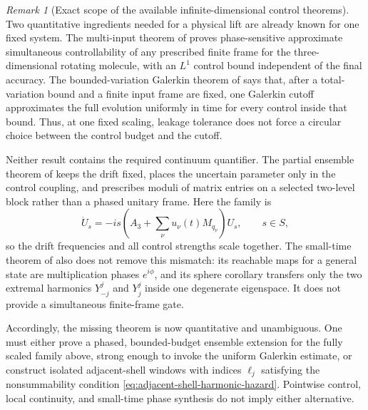 \documentclass[11pt]{article}
\theoremstyle{remark}
\newtheorem{remark}[theorem]{Remark}
\begin{document}
\begin{remark}[Exact scope of the available infinite-dimensional control theorems]
\label{rem:infinite-control-theorem-audit}
Two quantitative ingredients needed for a physical lift are already known
for one fixed system.  The multi-input theorem of
\cite{BoscainCaponigroSigalotti2013} proves phase-sensitive approximate
simultaneous controllability of any prescribed finite frame for the
three-dimensional rotating molecule, with an $L^1$ control bound independent
of the final accuracy.  The bounded-variation Galerkin theorem of
\cite{BoussaidCaponigroChambrion2014} says that, after a total-variation bound
and a finite input frame are fixed, one Galerkin cutoff approximates the full
evolution uniformly in time for every control inside that bound.  Thus, at
one fixed scaling, leakage tolerance does not force a circular choice between
the control budget and the cutoff.

Neither result contains the required continuum quantifier.  The partial
ensemble theorem of \cite{Chambrion2013} keeps the drift fixed, places the
uncertain parameter only in the control coupling, and prescribes moduli of
matrix entries on a selected two-level block rather than a phased unitary
frame.  Here the family is
\[
 \dot U_s=-is\left(A_3+\sum_\nu u_\nu(t)M_{q_\nu}\right)U_s,
 \qquad s\in S,
\]
so the drift frequencies and all control strengths scale together.  The
small-time theorem of \cite{ChambrionPozzoli2023} also does not remove this
mismatch: its reachable maps for a general state are multiplication phases
$e^{i\phi}$, and its sphere corollary transfers only the two extremal
harmonics $Y^j_{-j}$ and $Y^j_j$ inside one degenerate eigenspace.  It does
not provide a simultaneous finite-frame gate.

Accordingly, the missing theorem is now quantitative and unambiguous.  One
must either prove a phased, bounded-budget ensemble extension for the
fully scaled family above, strong enough to invoke the uniform Galerkin
estimate, or construct isolated adjacent-shell windows with indices
$\ell_j$ satisfying the nonsummability condition
\eqref{eq:adjacent-shell-harmonic-hazard}.  Pointwise control, local
continuity, and small-time phase synthesis do not imply either alternative.
\end{remark}
\end{document}
